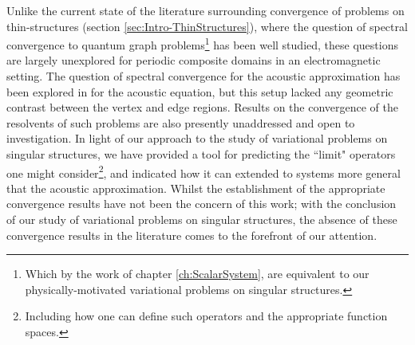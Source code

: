 Unlike the current state of the literature surrounding convergence of problems on thin-structures (section \ref{sec:Intro-ThinStructures}), where the question of spectral  convergence to quantum graph problems\footnote{Which by the work of chapter \ref{ch:ScalarSystem}, are equivalent to our physically-motivated variational problems on singular structures.} has been well studied, these questions are largely unexplored for periodic composite domains in an electromagnetic setting.
The question of spectral convergence for the acoustic approximation has been explored in  for the acoustic equation, but this setup lacked any geometric contrast between the vertex and edge regions.
Results on the convergence of the resolvents of such problems are also presently unaddressed and open to investigation.
In light of our approach to the study of variational problems on singular structures, we have provided a tool for predicting the ``limit" operators one might consider\footnote{Including how one can define such operators and the appropriate function spaces.}, and indicated how it can extended to systems more general that the acoustic approximation.
Whilst the establishment of the appropriate convergence results have not been the concern of this work; with the conclusion of our study of variational problems on singular structures, the absence of these convergence results in the literature comes to the forefront of our attention.